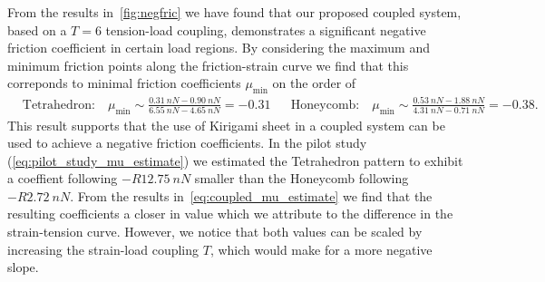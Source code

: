From the results in~\cref{fig:negfric} we have found that our proposed coupled
system, based on a $T = 6$ tension-load coupling, demonstrates a significant
negative friction coefficient in certain load regions. By considering the
maximum and minimum friction points along the friction-strain curve we find that
this correponds to minimal friction coefficients $\mu_{\min}$ on the order of
\begin{align}
  &\text{Tetrahedron:} \quad \mu_{\min} \sim \frac{\SI{0.31}{nN} - \SI{0.90}{nN}}{\SI{6.55}{nN} - \SI{4.65}{nN}} = -0.31& 
  &\text{Honeycomb:} \quad \mu_{\min} \sim \frac{\SI{0.53}{nN} - \SI{1.88}{nN}}{\SI{4.31}{nN} - \SI{0.71}{nN}} = -0.38.&
  \label{eq:coupled_mu_estimate}
\end{align}
This result supports that the use of Kirigami sheet in a coupled system can be used to achieve a negative friction coefficients. In the pilot study (\cref{eq:pilot_study_mu_estimate}) we estimated the Tetrahedron pattern to exhibit a coeffient following $-R \SI{12.75}{nN}$ smaller than the Honeycomb following $-R \SI{2.72}{nN}$. From the results in~\cref{eq:coupled_mu_estimate} we find that the resulting coefficients a closer in value which we attribute to the difference in the strain-tension curve. However, we notice that both values can be scaled by increasing the strain-load coupling $T$, which would make for a more negative slope. 